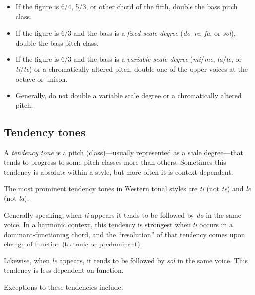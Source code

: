 \documentclass{book}
\providecommand{\tightlist}{%
  \setlength{\itemsep}{0pt}\setlength{\parskip}{0pt}}
\begin{document}
\begin{itemize}
\tightlist
\item
  If the figure is 6/4, 5/3, or other chord of the fifth, double the bass
  pitch class.\\
\item
  If the figure is 6/3 and the bass is a \emph{fixed scale degree} (\emph{do},
  \emph{re}, \emph{fa}, or \emph{sol}), double the bass pitch class.\\
\item
  If the figure is 6/3 and the bass is a \emph{variable scale degree}
  (\emph{mi}/\emph{me}, \emph{la}/\emph{le}, or \emph{ti}/\emph{te}) or a
  chromatically altered pitch, double one of the upper voices at the octave or
  unison.\\
\item
  Generally, do not double a variable scale degree or a chromatically altered
  pitch.
\end{itemize}

\hypertarget{tendency-tones}{%
\subsection{Tendency tones}\label{tendency-tones}}

A \emph{tendency tone} is a pitch (class)---usually represented as a scale
degree---that tends to progress to some pitch classes more than others.
Sometimes this tendency is absolute within a style, but more often it is
context-dependent.

The most prominent tendency tones in Western tonal styles are \emph{ti} (not
\emph{te}) and \emph{le} (not \emph{la}).

Generally speaking, when \emph{ti} appears it tends to be followed by
\emph{do} in the same voice. In a harmonic context, this tendency is strongest
when \emph{ti} occurs in a dominant-functioning chord, and the ``resolution''
of that tendency comes upon change of function (to tonic or predominant).

Likewise, when \emph{le} appears, it tends to be followed by \emph{sol} in the
same voice. This tendency is less dependent on function.

Exceptions to these tendencies include:
\end{document}
